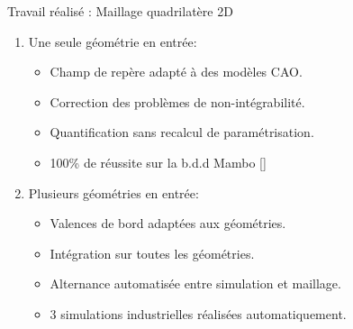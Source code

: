 \begin{frame}{Travail réalisé : Maillage quadrilatère 2D}
    \begin{enumerate}
        \item Une seule géométrie en entrée:
        \begin{itemize}
            \item Champ de repère adapté à des modèles CAO.
            \item Correction des problèmes de non-intégrabilité.
            \item Quantification sans recalcul de paramétrisation.
            \item 100\% de réussite sur la b.d.d Mambo [\cite{ledoux_mambo_2019}] 
        \end{itemize}
        \pause
        \item Plusieurs géométries en entrée:
        \begin{itemize}
            \item Valences de bord adaptées aux géométries.
            \item Intégration sur toutes les géométries.
            \item Alternance automatisée entre simulation et maillage. 
            \item 3 simulations industrielles réalisées automatiquement. 
        \end{itemize}
    \end{enumerate}
\end{frame}
    
\iffalse
\begin{frame}{Travail réalisé : Maillage hexaédrique 3D}
    \begin{enumerate}
        \item Réparation incrémentale des graphes de singularité
        \item Champ de repère avec singularités de bord imposés.
    \end{enumerate}

    \begin{itemize}
        \item "[\cite{ledoux_mambo_2019}]" / \cite{ray_practical_2016} / \cite{ray_practical_2016} + (1) / \cite{ray_practical_2016} + (2)
        \item "Basique" (74 modèles) / 18\% / 40\% / 69\%
        \item "Simple" (29 modèles) / 0\% / 21\% / 34\%
        \item "Medium" (9 modèles) / 0\% / 0\% / 0\%
    \end{itemize}
\end{frame}
\fi

